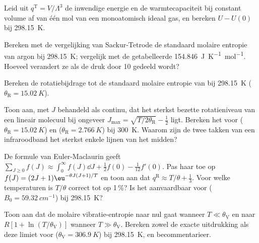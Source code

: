\begin{exercise}[$\star\star$]\label{exo:b3:partition-functions:7}
Leid uit $q^{\mathrm T} = V/\Lambda^3$ de inwendige energie en de
warmtecapaciteit bij constant volume af van één mol van een monoatomisch
ideaal gas, en bereken $U - U(0)$ bij
\qty{298.15}{K}.
\end{exercise}

\begin{exercise}[$\star\star$]\label{exo:b3:partition-functions:8}
Bereken met de vergelijking van Sackur-Tetrode de standaard molaire
entropie van argon bij \qty{298.15}{K}; vergelijk met de getabelleerde
\qty{154.846}{J.K^{-1}.mol^{-1}}. Hoeveel verandert ze als de druk door 10
gedeeld wordt?
\end{exercise}

\begin{exercise}[$\star\star$]\label{exo:b3:partition-functions:9}
Bereken de rotatiebijdrage tot de standaard molaire entropie van
 bij \qty{298.15}{K} ($\theta_{\mathrm R} = \qty{15.02}{K}$).
\end{exercise}

\begin{exercise}[$\star\star\star$]\label{exo:b3:partition-functions:10}
Toon aan, met $J$ behandeld als continu, dat het sterkst bezette
rotatieniveau van een lineair molecuul bij ongeveer $J_{\max} = \sqrt{T/2\theta_{\mathrm R}} - \frac12$
ligt. Bereken het voor 
($\theta_{\mathrm R} = \qty{15.02}{K}$) en  ($\theta_{\mathrm R} = \qty{2.766}{K}$) bij \qty{300}{K}. Waarom zijn de twee
takken van een infraroodband het sterkst enkele lijnen van het midden?
\end{exercise}

\begin{exercise}[$\star\star\star$]\label{exo:b3:partition-functions:11}
De formule van Euler-Maclaurin geeft $\sum_{J\ge0}f(J) \approx \int_0^\infty f(J)\dd J + \frac12f(0) -
\frac1{12}f'(0)$. Pas haar toe op $f(J) = (2J+1)\eu^{-\theta J(J+1)/T}$ en toon aan dat $q^{\mathrm R} \approx T/\theta +
\frac13$. Voor welke temperaturen is $T/\theta$ correct tot op 1\,\%? Is het
aanvaardbaar voor 
($B_0 = \qty{59.32}{cm^{-1}}$) bij \qty{298.15}{K}?
\end{exercise}

\begin{exercise}[$\star\star\star$]\label{exo:b3:partition-functions:12}
Toon aan dat de molaire vibratie-entropie naar nul gaat wanneer $T \ll \theta_{\mathrm V}$ en naar
$R[1 + \ln(T/\theta_{\mathrm V})]$ wanneer $T \gg \theta_{\mathrm V}$. Bereken zowel de
exacte uitdrukking als deze limiet voor  ($\theta_{\mathrm V} = \qty{306.9}{K}$) bij \qty{298.15}{K}, en becommentarieer.
\end{exercise}

